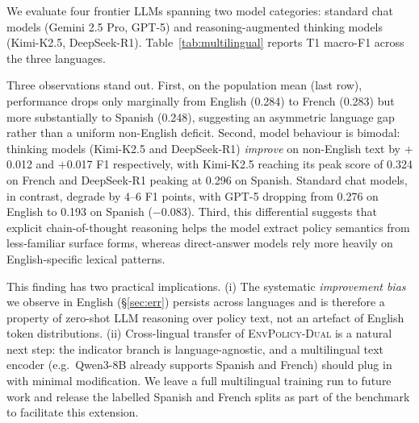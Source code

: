 \documentclass[11pt]{article}
\newcommand{\ours}{\textsc{EnvPolicy-Dual}}
\begin{document}
We evaluate four frontier LLMs spanning two model categories: standard
chat models (Gemini 2.5 Pro, GPT-5) and reasoning-augmented thinking
models (Kimi-K2.5, DeepSeek-R1). Table~\ref{tab:multilingual} reports
T1 macro-F1 across the three languages.

\begin{table}[!t]
\centering\small
\setlength{\tabcolsep}{4pt}
\caption{Multilingual evaluation of zero-shot LLMs on FAOLEX policy texts. $\Delta$ reports average non-English performance relative to English. $^\star$ denotes reasoning-augmented models.}
\label{tab:multilingual}
\end{table}

Three observations stand out. First, on the population mean (last row),
performance drops only marginally from English (0.284) to French (0.283)
but more substantially to Spanish (0.248), suggesting an asymmetric
language gap rather than a uniform non-English deficit. Second, model
behaviour is bimodal: thinking models (Kimi-K2.5 and DeepSeek-R1)
\emph{improve} on non-English text by $+$0.012 and $+$0.017 F1
respectively, with Kimi-K2.5 reaching its peak score of 0.324 on French
and DeepSeek-R1 peaking at 0.296 on Spanish. Standard chat models, in
contrast, degrade by $4$--$6$ F1 points, with GPT-5 dropping from 0.276
on English to 0.193 on Spanish ($-$0.083). Third, this differential
suggests that explicit chain-of-thought reasoning helps the model
extract policy semantics from less-familiar surface forms, whereas
direct-answer models rely more heavily on English-specific lexical
patterns.

This finding has two practical implications. (i) The systematic
\emph{improvement bias} we observe in English (\S\ref{sec:err}) persists
across languages and is therefore a property of zero-shot LLM
reasoning over policy text, not an artefact of English token
distributions. (ii) Cross-lingual transfer of \ours{} is a natural next
step: the indicator branch is language-agnostic, and a multilingual
text encoder (e.g.\ Qwen3-8B already supports Spanish and French)
should plug in with minimal modification. We leave a full multilingual
training run to future work and release the labelled Spanish and French
splits as part of the benchmark to facilitate this extension.
\end{document}
